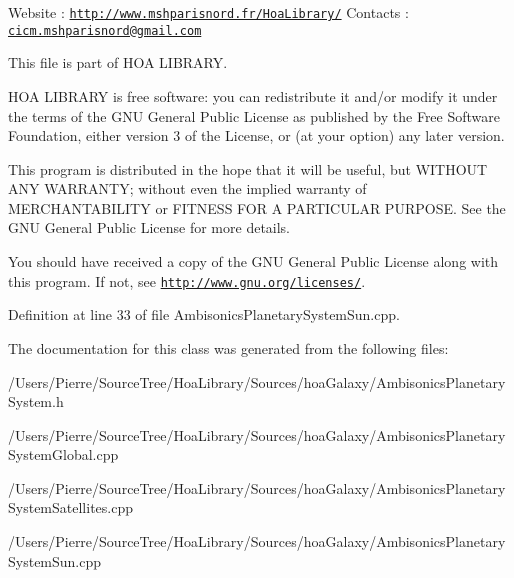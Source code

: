 Website \-: \href{http://www.mshparisnord.fr/HoaLibrary/}{\tt http\-://www.\-mshparisnord.\-fr/\-Hoa\-Library/} Contacts \-: \href{mailto:cicm.mshparisnord@gmail.com}{\tt cicm.\-mshparisnord@gmail.\-com}

This file is part of H\-O\-A L\-I\-B\-R\-A\-R\-Y.

H\-O\-A L\-I\-B\-R\-A\-R\-Y is free software\-: you can redistribute it and/or modify it under the terms of the G\-N\-U General Public License as published by the Free Software Foundation, either version 3 of the License, or (at your option) any later version.

This program is distributed in the hope that it will be useful, but W\-I\-T\-H\-O\-U\-T A\-N\-Y W\-A\-R\-R\-A\-N\-T\-Y; without even the implied warranty of M\-E\-R\-C\-H\-A\-N\-T\-A\-B\-I\-L\-I\-T\-Y or F\-I\-T\-N\-E\-S\-S F\-O\-R A P\-A\-R\-T\-I\-C\-U\-L\-A\-R P\-U\-R\-P\-O\-S\-E. See the G\-N\-U General Public License for more details.

You should have received a copy of the G\-N\-U General Public License along with this program. If not, see \href{http://www.gnu.org/licenses/}{\tt http\-://www.\-gnu.\-org/licenses/}. 

Definition at line 33 of file Ambisonics\-Planetary\-System\-Sun.\-cpp.



The documentation for this class was generated from the following files\-:\begin{DoxyCompactItemize}
\item 
/\-Users/\-Pierre/\-Source\-Tree/\-Hoa\-Library/\-Sources/hoa\-Galaxy/Ambisonics\-Planetary\-System.\-h\item 
/\-Users/\-Pierre/\-Source\-Tree/\-Hoa\-Library/\-Sources/hoa\-Galaxy/Ambisonics\-Planetary\-System\-Global.\-cpp\item 
/\-Users/\-Pierre/\-Source\-Tree/\-Hoa\-Library/\-Sources/hoa\-Galaxy/Ambisonics\-Planetary\-System\-Satellites.\-cpp\item 
/\-Users/\-Pierre/\-Source\-Tree/\-Hoa\-Library/\-Sources/hoa\-Galaxy/Ambisonics\-Planetary\-System\-Sun.\-cpp\end{DoxyCompactItemize}
